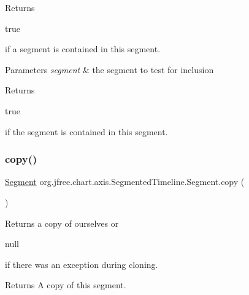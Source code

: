 Returns
\begin{DoxyCode}
\textcolor{keyword}{true} 
\end{DoxyCode}
 if a segment is contained in this segment.


\begin{DoxyParams}{Parameters}
{\em segment} & the segment to test for inclusion\\
\hline
\end{DoxyParams}
\begin{DoxyReturn}{Returns}

\begin{DoxyCode}
\textcolor{keyword}{true} 
\end{DoxyCode}
 if the segment is contained in this segment. 
\end{DoxyReturn}
\mbox{\label{classorg_1_1jfree_1_1chart_1_1axis_1_1_segmented_timeline_1_1_segment_a74a40425a7d0db77b39f43bc31b149eb}} 
\subsubsection{\texorpdfstring{copy()}{copy()}}
{\footnotesize\ttfamily \mbox{\hyperlink{classorg_1_1jfree_1_1chart_1_1axis_1_1_segmented_timeline_1_1_segment}{Segment}} org.\+jfree.\+chart.\+axis.\+Segmented\+Timeline.\+Segment.\+copy (\begin{DoxyParamCaption}{ }\end{DoxyParamCaption})}

Returns a copy of ourselves or
\begin{DoxyCode}
null 
\end{DoxyCode}
 if there was an exception during cloning.

\begin{DoxyReturn}{Returns}
A copy of this segment. 
\end{DoxyReturn}
\mbox{\label{classorg_1_1jfree_1_1chart_1_1axis_1_1_segmented_timeline_1_1_segment_a7578526ca43702e62e37e60e3228130c}} 
